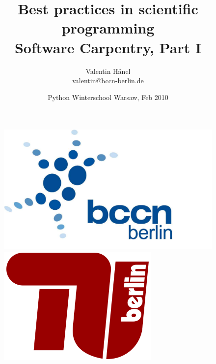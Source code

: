 \documentclass[ hyperref={colorlinks=true,filecolor=blue,linkcolor=blue,urlcolor=blue}]{beamer}
\author{Valentin H\"anel\\
        valentin@bccn-berlin.de}
\institute{Technische Universität Berlin \\
Bernstein Center for Computational Neuroscience Berlin}
\title{Best practices in scientific programming\\
Software Carpentry, Part I}
\date{Python Winterschool Warsaw, Feb 2010}
\begin{document}
\begin{frame}
	\titlepage
    \begin{figure}
	    \includegraphics[scale=0.05]{BCCN_logo_berlin.pdf}
	    \includegraphics[scale=0.14]{tu_logo.png}
    \end{figure}
\end{frame}


\end{document}
